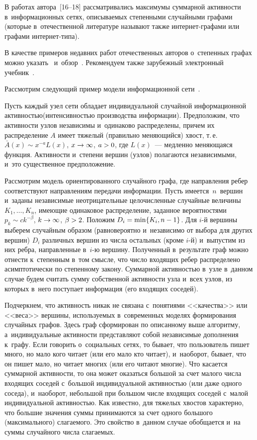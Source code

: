\begin{multicols}{2}
В работах автора~[16--18]
рассматривались максимумы суммарной активности
в~информационных сетях, описываемых степенными случайными графами
(которые в~отечественной литературе называют также ин\-тер\-нет-гра\-фа\-ми
или графами ин\-тер\-нет-типа).

В качестве примеров недавних работ отечественных авторов о~степенных графах
можно указать~\cite{Pavl, Leri} и~обзор~\cite{Raig}. Рекомендуем также зарубежный
электронный учебник~\cite{Hofstad}.

Рассмотрим следующий пример модели информационной сети~\cite{Leb4}.

Пусть каждый узел сети обладает индивидуальной случайной
информационной активностью\linebreak (интенсив\-ностью производства информации).
Предположим, что активности узлов независимы и~одинаково
распределены, причем их распределение $A$ имеет тяжелый (правильно
меняющийся) хвост, т.\,е.\ ${\bar A}(x)\sim x^{-a}L(x)$, $x\hm\to\infty$,
$a\hm>0$, где $L(x)$~--- медленно меняющаяся функция. Активности
и~степени вершин (узлов) полагаются независимыми, и~это существенное
предположение.

Рассмотрим модель ориентированного
случайного графа, где направления ребер соответствуют направлениям
передачи информации. Пусть имеется~$n$~вершин и~заданы независимые
не\-от\-ри\-ца\-тельные целочисленные случайные величины $K_1,\ldots , K_n$,
имеющие одинаковое
распределение, заданное вероятностями $p_k\sim ck^{-\beta}$, $k\hm\to\infty$,
$\beta\hm>2$. Положим $D_i\hm=\min\{K_i,n-1\}$. Для $i$-й вершины выберем
случайным образом (равновероятно и~независимо от выбора для других
вершин) $D_i$ различных вершин из числа остальных (кроме $i$-й)
и~выпустим из них ребра, направленные в~$i$-ю вершину. Полученный
в~результате граф можно отнести к~степенным в~том смысле, что число
входящих ребер распределено асимптотически по степенному закону.
Суммарной активностью в~узле в~данном случае будем считать сумму
собственной активности узла и~всех узлов, из которых в~него
поступает информация (его входящих со\-седей).
{

}

Подчеркнем, что активность никак не связана с~понятиями <<качества>> или <<веса>> вершины,
используемых в~современных моделях формирования случайных графов. Здесь граф
сформирован по описанному выше алгоритму, а~индивидуальные активности представляют
собой независимые дополнения к~графу. Если говорить о~социальных сетях, то бывает,
что пользователь пишет много, но мало кого читает (или его мало кто читает),
и~на\-обо\-рот,
бывает, что он пишет мало, но читает многих (или его читают многие). Что касается
суммарной активности, то она может оказаться большой за счет малого числа входящих
соседей с~большой индивидуальной активностью (или даже одного соседа), и~наоборот,
небольшой при большом числе входящих соседей с~малой индивидуальной активностью.
Как известно, для тяжелых хвостов характерно, что большие значения суммы
принимаются за счет одного большого (максимального) слагаемого. Это свойство в~данном случае обобщается и~на суммы случайного числа слагаемых.


\end{multicols}
